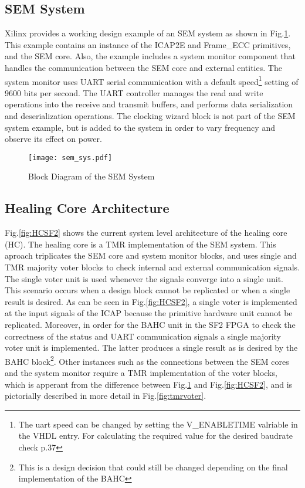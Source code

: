 \subsection{SEM System}
Xilinx provides a working design example of an SEM system as shown in Fig.\ref{fig:semsys}. This example contains an instance of the ICAP2E and Frame\_ECC primitives, and the SEM core. Also, the example includes a system monitor component that handles the communication between the SEM core and external entities. The system monitor uses UART serial communication with a default speed\footnote{The uart speed can be changed by setting the V\_ENABLETIME valriable in the VHDL entry. For calculating the required value for the desired baudrate check \cite{SEM.Xilinx-15} p.37} setting of 9600 bits per second. The UART controller manages the read and write operations into the receive and transmit buffers, and performs data serialization and deserialization operations. The clocking wizard block is not part of the SEM system example, but is added to the system in order to vary frequency and observe its effect on power.

\begin{figure}[!ht]
    \centering
        \texttt{[image: sem\_sys.pdf]}
        \caption{Block Diagram of the SEM System}
    \label{fig:semsys}
\end{figure}


\subsection{Healing Core Architecture}
Fig.\ref{fig:HCSF2} shows the current system level architecture of the healing core (HC). The healing core is a TMR implementation of the SEM system. This aproach triplicates the SEM core and system monitor blocks, and uses single and TMR majority voter blocks to check internal and external communication signals. The single voter unit is used whenever the signals converge into a single unit. This scenario occurs when a design block cannot be replicated or when a single result is desired. As can be seen in Fig.\ref{fig:HCSF2}, a single voter is implemented at the input signals of the ICAP because the primitive hardware unit cannot be replicated. Moreover, in order for the BAHC unit in the SF2 FPGA to check the correctness of the status and UART communication signals a single majority voter unit is implemented. The latter produces a single result as is desired by the BAHC block\footnote{This is a design decision that could still be changed depending on the final implementation of the BAHC}. Other instances such as the connections between the SEM cores and the system monitor require a TMR implementation of the voter blocks, which is apperant from the difference between Fig.\ref{fig:semsys} and Fig.\ref{fig:HCSF2}, and is pictorially described in more detail in Fig.\ref{fig:tmrvoter}.  

